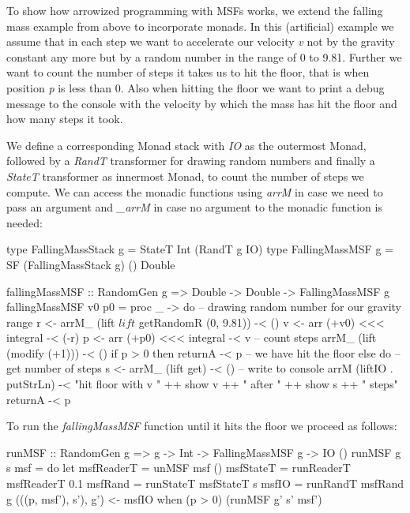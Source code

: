 To show how arrowized programming with MSFs works, we extend the falling mass example from above to incorporate monads. In this (artificial) example we assume that in each step we want to accelerate our velocity \textit{v} not by the gravity constant any more but by a random number in the range of 0 to 9.81. Further we want to count the number of steps it takes us to hit the floor, that is when position \textit{p} is less than 0. Also when hitting the floor we want to print a debug message to the console with the velocity by which the mass has hit the floor and how many steps it took.

We define a corresponding Monad stack with \textit{IO} as the outermost Monad, followed by a \textit{RandT} transformer for drawing random numbers and finally a \textit{StateT} transformer as innermost Monad, to count the number of steps we compute. We can access the monadic functions using \textit{arrM} in case we need to pass an argument and \textit{\_arrM} in case no argument to the monadic function is needed:

\begin{HaskellCode}
type FallingMassStack g = StateT Int (RandT g IO)
type FallingMassMSF g   = SF (FallingMassStack g) () Double

fallingMassMSF :: RandomGen g => Double -> Double -> FallingMassMSF g
fallingMassMSF v0 p0 = proc _ -> do
  -- drawing random number for our gravity range
  r <- arrM_ (lift $ lift $ getRandomR (0, 9.81)) -< ()
  v <- arr (+v0) <<< integral -< (-r)
  p <- arr (+p0) <<< integral -< v
  -- count steps
  arrM_ (lift (modify (+1))) -< ()
  if p > 0
    then returnA -< p
    -- we have hit the floor
    else do
      -- get number of steps
      s <- arrM_ (lift get) -< ()
      -- write to console
      arrM (liftIO . putStrLn) -< "hit floor with v " ++ show v ++ 
                                  " after " ++ show s ++ " steps"
      returnA -< p
\end{HaskellCode}

To run the \textit{fallingMassMSF} function until it hits the floor we proceed as follows:

\begin{HaskellCode}
runMSF :: RandomGen g => g -> Int -> FallingMassMSF g -> IO ()
runMSF g s msf = do
  let msfReaderT = unMSF msf ()
      msfStateT  = runReaderT msfReaderT 0.1
      msfRand    = runStateT msfStateT s
      msfIO      = runRandT msfRand g
  (((p, msf'), s'), g') <- msfIO
  when (p > 0) (runMSF g' s' msf')
\end{HaskellCode}

